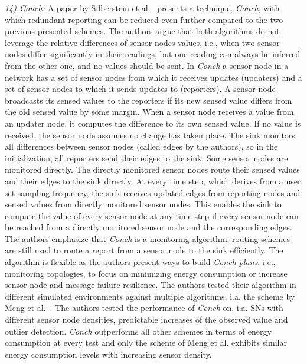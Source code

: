\textit{14) Conch:}
A paper by Silberstein et al.~\cite{silberstein2006constraint} presents a
technique, \textit{Conch}, with which redundant reporting can be reduced even
further compared to the two previous presented schemes. The authors argue that
both algorithms do not leverage the relative differences of sensor nodes
values, i.e., when two sensor nodes differ significantly in their readings, but
one reading can always be inferred from the other one, and no values should be
sent. In \textit{Conch} a sensor node in a network has a set of sensor nodes
from which it receives updates (updaters) and a set of sensor nodes to which it
sends updates to (reporters). A sensor node broadcasts its sensed values to the
reporters if its new sensed value differs from the old sensed value by some
margin. When a sensor node receives a value from an updater node, it computes
the difference to its own sensed value. If no value is received, the sensor
node assumes no change has taken place. The sink monitors all differences
between sensor nodes (called edges by the authors), so in the initialization,
all reporters send their edges to the sink. Some sensor nodes are monitored
directly. The directly monitored sensor nodes route their sensed values and
their edges to the sink directly. At every time step, which derives from a user
set sampling frequency, the sink receives updated edges from reporting nodes
and sensed values from directly monitored sensor nodes. This enables the sink
to compute the value of every sensor node at any time step if every sensor node
can be reached from a directly monitored sensor node and the corresponding
edges. The authors emphasize that \textit{Conch} is a monitoring algorithm;
routing schemes are still used to route a report from a sensor node to the sink
efficiently. The algorithm is flexible as the authors present ways to build
\textit{Conch plans}, i.e., monitoring topologies, to focus on minimizing
energy consumption or increase sensor node and message failure resilience. The
authors tested their algorithm in different simulated environments against
multiple algorithms, i.a. the scheme by Meng et al.~\cite{meng2004event}. The
authors tested the performance of \textit{Conch} on, i.a. \acp{SN} with
different sensor node densities, predictable increases of the observed value
and outlier detection. \textit{Conch} outperforms all other schemes in terms of
energy consumption at every test and only the scheme of Meng et al. exhibits
similar energy consumption levels with increasing sensor density.

